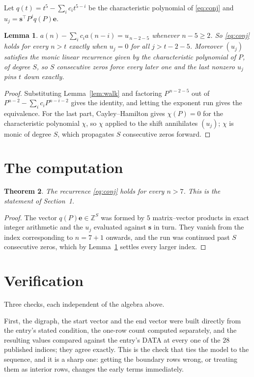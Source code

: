 \documentclass[11pt,a4paper]{article}
\theoremstyle{plain}
\newtheorem{theorem}{Theorem}
\newtheorem{lemma}[theorem]{Lemma}
\theoremstyle{definition}
\begin{document}
Let $q(t)=t^{5}-\sum_i c_i t^{5-i}$ be the characteristic polynomial of
\eqref{eq:conj} and $u_j=\mathbf{s}^{\!\top}P^{j}q(P)\mathbf{e}$.

\begin{lemma}\label{lem:crit}
$a(n)-\sum_i c_i a(n-i)=u_{\,n-2-5}$ whenever $n-5\ge2$. So \eqref{eq:conj}
holds for every $n>t$ exactly when $u_j=0$ for all $j>t-2-5$. Moreover $(u_j)$
satisfies the monic linear recurrence given by the characteristic polynomial of $P$, of
degree $S$, so $S$ consecutive zeros force every later one and the last nonzero $u_j$ pins
$t$ down exactly.
\end{lemma}

\begin{proof}
Substituting Lemma~\ref{lem:walk} and factoring $P^{\,n-2-5}$ out of
$P^{n-2}-\sum_i c_i P^{n-i-2}$ gives the identity, and letting the exponent run gives the
equivalence. For the last part, Cayley--Hamilton gives $\chi(P)=0$ for the characteristic
polynomial $\chi$, so $\chi$ applied to the shift annihilates $(u_j)$; $\chi$ is monic of
degree $S$, which propagates $S$ consecutive zeros forward.
\end{proof}

\section{The computation}

\begin{theorem}
The recurrence \eqref{eq:conj} holds for every $n>7$. This is the statement of
Section~1.
\end{theorem}

\begin{proof}
The vector $q(P)\mathbf{e}\in\mathbb{Z}^{S}$ was formed by $5$ matrix--vector
products in exact integer arithmetic and the $u_j$ evaluated against $\mathbf{s}$ in turn.
They vanish from the index corresponding to $n=7+1$ onwards, and the run was continued
past $S$ consecutive zeros, which by Lemma~\ref{lem:crit} settles every larger index.
\end{proof}

\section{Verification}

Three checks, each independent of the algebra above.

First, the digraph, the start vector and the end vector were built directly from the
entry's stated condition, the one-row count computed separately, and the resulting values
compared against the entry's DATA at every one of the $28$ published indices; they
agree exactly. This is the check that ties the model to the sequence, and it is a sharp one:
getting the boundary rows wrong, or treating them as interior rows, changes the early terms
immediately.
\end{document}
